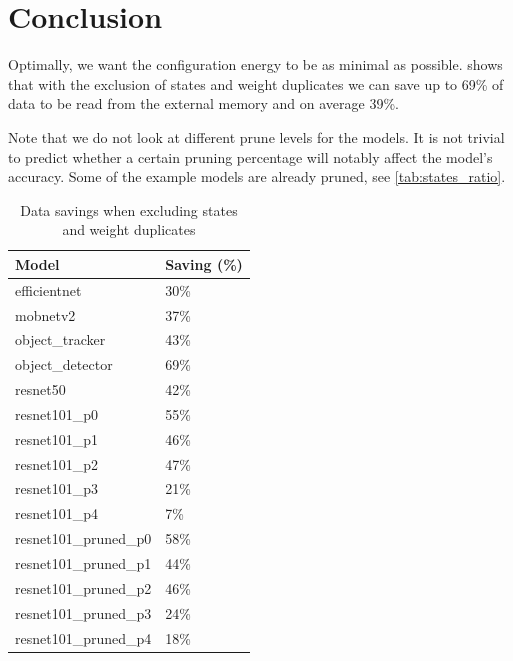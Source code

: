 \section{Conclusion}
Optimally, we want the configuration energy to be as minimal as possible.
 shows that with the exclusion of states and weight duplicates we can save up to 69\% of data to be read from the external memory and on average 39\%.

Note that we do not look at different prune levels for the models.
It is not trivial to predict whether a certain pruning percentage will notably affect the model's accuracy.
Some of the example models are already pruned, see \cref{tab:states_ratio}.

\begin{table}[hbtp]
\centering
\begin{tabular}{@{}ll@{}}
\toprule
\textbf{Model}          & \textbf{Saving (\%)} \\ \midrule
efficientnet            & 30\%                 \\
mobnetv2                & 37\%                 \\
object\_tracker         & 43\%                 \\
object\_detector        & 69\%                 \\
resnet50                & 42\%                 \\
resnet101\_p0           & 55\%                 \\
resnet101\_p1           & 46\%                 \\
resnet101\_p2           & 47\%                 \\
resnet101\_p3           & 21\%                 \\
resnet101\_p4           & 7\%                  \\
resnet101\_pruned\_p0   & 58\%                 \\
resnet101\_pruned\_p1   & 44\%                 \\
resnet101\_pruned\_p2   & 46\%                 \\
resnet101\_pruned\_p3   & 24\%                 \\
resnet101\_pruned\_p4   & 18\%                 \\ \bottomrule
\end{tabular}
\caption{Data savings when excluding states and weight duplicates}
\label{tab:savings}
\end{table}

